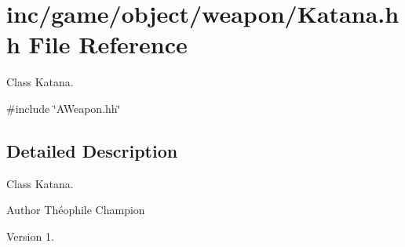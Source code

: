 \hypertarget{Katana_8hh}{}\section{inc/game/object/weapon/\+Katana.hh File Reference}
\label{Katana_8hh}


Class Katana.  


{\ttfamily \#include \char`\"{}A\+Weapon.\+hh\char`\"{}}\newline


\subsection{Detailed Description}
Class Katana. 

\begin{DoxyAuthor}{Author}
Théophile Champion 
\end{DoxyAuthor}
\begin{DoxyVersion}{Version}
1. 
\end{DoxyVersion}
